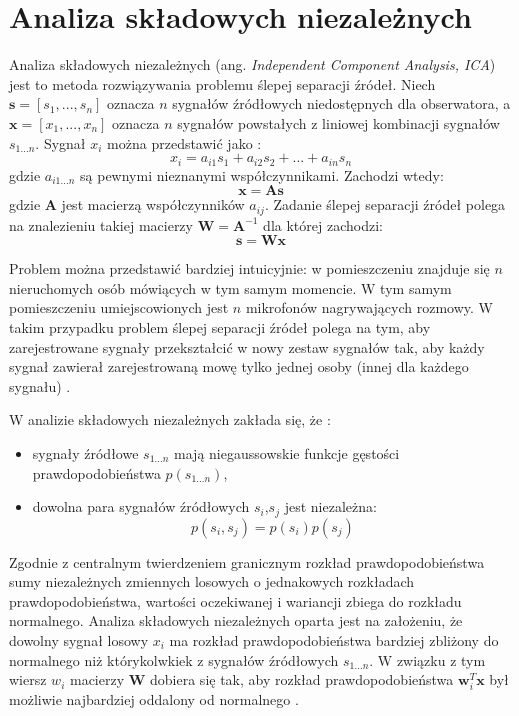 \documentclass[notitlepage]{report}
\begin{document}
\section{Analiza składowych niezależnych}
Analiza składowych niezależnych (ang. \textit{Independent Component Analysis, ICA}) jest to metoda rozwiązywania problemu ślepej separacji źródeł. Niech $\mathbf{s} = \left[s_1,...,s_n\right]$ oznacza $n$ sygnałów źródłowych niedostępnych dla obserwatora, a $\mathbf{x} = \left[x_1,...,x_n\right]$ oznacza $n$ sygnałów powstałych z liniowej kombinacji sygnałów $s_{1...n}$. Sygnał $x_i$ można przedstawić jako \cite{oja} \cite{langlois}:
\begin{equation}
x_i = a_{i1}s_1 + a_{i2}s_2 + ... + a_{in}s_n
\end{equation}
gdzie $a_{i1...n}$ są pewnymi nieznanymi współczynnikami. Zachodzi wtedy:
\begin{equation}
\mathbf{x} = \mathbf{As}
\end{equation}
gdzie $\mathbf{A}$ jest macierzą współczynników $a_{ij}$. Zadanie ślepej separacji źródeł polega na znalezieniu takiej macierzy $\mathbf{W} = \mathbf{A}^{-1}$ dla której zachodzi:
\begin{equation}
\mathbf{s} = \mathbf{Wx}
\end{equation}

Problem można przedstawić bardziej intuicyjnie: w pomieszczeniu znajduje się $n$ nieruchomych osób mówiących w tym samym momencie. W tym samym pomieszczeniu umiejscowionych jest $n$ mikrofonów nagrywających rozmowy. W takim przypadku problem ślepej separacji źródeł polega na tym, aby zarejestrowane sygnały przekształcić w nowy zestaw sygnałów tak, aby każdy sygnał zawierał zarejestrowaną mowę tylko jednej osoby (innej dla każdego sygnału) \cite{oja} \cite{langlois}.

W analizie składowych niezależnych zakłada się, że \cite{oja} \cite{langlois}:
\begin{itemize}
	\item sygnały źródłowe $s_{1...n}$ mają niegaussowskie funkcje gęstości prawdopodobieństwa $p(s_{1...n})$, 
	\item dowolna para sygnałów źródłowych $s_i$,$s_j$ jest niezależna:
	\begin{equation}
	p(s_i,s_j) = p(s_i)p(s_j)
	\end{equation}  
\end{itemize}
Zgodnie z centralnym twierdzeniem granicznym rozkład prawdopodobieństwa sumy niezależnych zmiennych losowych o jednakowych rozkładach prawdopodobieństwa, wartości oczekiwanej i wariancji zbiega do rozkładu normalnego. Analiza składowych niezależnych oparta jest na założeniu, że dowolny sygnał losowy $x_i$ ma rozkład prawdopodobieństwa bardziej zbliżony do normalnego niż którykolwkiek z sygnałów źródłowych $s_{1...n}$. W związku z tym wiersz $w_i$ macierzy $\mathbf{W}$ dobiera się tak, aby rozkład prawdopodobieństwa $\mathbf{w}^{T}_{i}\mathbf{x}$ był możliwie najbardziej oddalony od normalnego \cite{oja}. 
\end{document}
